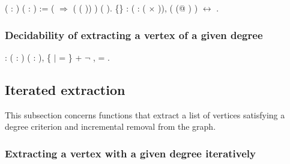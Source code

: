 \begin{coqdoccode}
\coqdocemptyline
\coqdocnoindent
{}  ( : ) ( : ) :=\coqdoceol
\coqdocindent{1.00em}
 (  \ensuremath{\Rightarrow}  ( ( )) ) ( ).\coqdoceol
\coqdocemptyline
\coqdocnoindent
{}  \{\} : \coqdockw{\ensuremath{\forall}}  ( :  ( \ensuremath{\times} )), ( (@ )  ) \ensuremath{\leftrightarrow}   .\coqdoceol
 \coqdocemptyline
\end{coqdoccode}
\subsubsection{Decidability of extracting a vertex of a given degree}


\begin{coqdoccode}
\coqdocemptyline
\coqdocnoindent
{}  : \coqdockw{\ensuremath{\forall}} ( : ) ( : ),\coqdoceol
\coqdocindent{2.00em}
\{ \ensuremath{|}    =  \} + \ensuremath{\lnot} \coqdoctac{\ensuremath{\exists}} ,    =  .\coqdoceol
\coqdocemptyline
\end{coqdoccode}
\subsection{Iterated extraction}

 This subsection concerns functions that extract a list of vertices
    satisfying a degree criterion and incremental removal from the
    graph.

\subsubsection{Extracting a vertex with a given degree iteratively}


